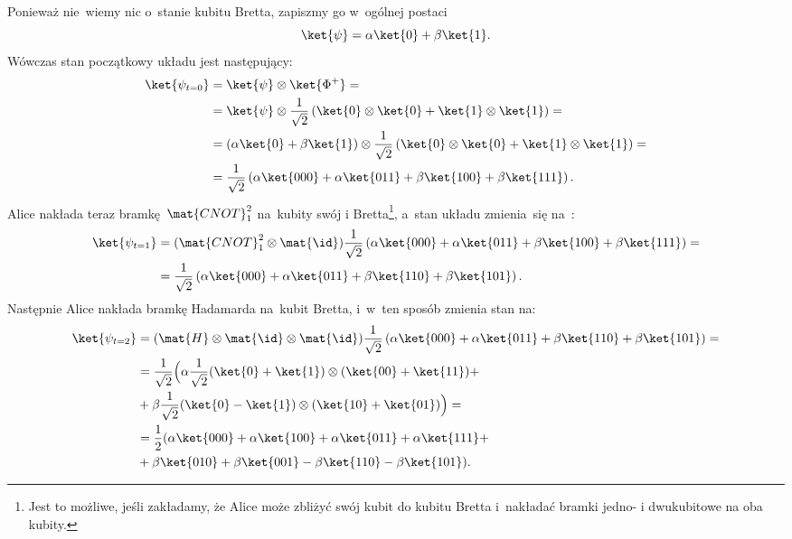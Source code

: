 Ponieważ nie~wiemy nic o~stanie kubitu Bretta, zapiszmy go w~ogólnej postaci
$$
	\ket{\psi} = \alpha \ket{0} + \beta \ket{1}.
$$
Wówczas stan początkowy układu jest następujący:
\begin{equation*}
	\begin{split}
		\ket{\psi_{t=0}} &=  \ket{\psi} \otimes \ket{\Phi^+}  =\\
		&= \ket{\psi} \otimes \frac{1}{\sqrt{2}}\left( \ket{0} \otimes \ket{0} +\ket{1} \otimes \ket{1} \right) = \\
		&= \left(\alpha \ket{0} + \beta  \ket{1}\right) \otimes \frac{1}{\sqrt{2}}\left( \ket{0} \otimes \ket{0} +\ket{1} \otimes \ket{1} \right)= \\
		&= \frac{1}{\sqrt{2}} \left(\alpha \ket{000} + \alpha \ket{011} + \beta  \ket{100} + \beta  \ket{111}  \right).
	\end{split}
\end{equation*}
Alice nakłada teraz bramkę~$\mat{CNOT}_1^2$ na~kubity swój i
Bretta\footnote{Jest to możliwe, jeśli zakładamy, że Alice może zbliżyć swój
	kubit do kubitu Bretta i~nakładać bramki jedno- i dwukubitowe na oba
	kubity.}, a~stan układu zmienia~się na~:
\begin{equation*}
	\begin{split}
		\ket{\psi_{t=1}} &= (\mat{CNOT}_1^2\otimes \mat{\id}) \frac{1}{\sqrt{2}} \left(\alpha \ket{000} + \alpha \ket{011} + \beta \ket{100} + \beta \ket{111}  \right) =\\
		&=\frac{1}{\sqrt{2}} \left(\alpha \ket{000} + \alpha \ket{011} + \beta \ket{110} + \beta \ket{101}  \right).
	\end{split}
\end{equation*}
Następnie Alice nakłada bramkę Hadamarda na~kubit Bretta, i~w~ten sposób zmienia stan na:
\begin{equation*}
	\begin{split}
		\ket{\psi_{t=2}} &=( \mat{H}\otimes\mat{\id}\otimes\mat{\id}) \frac{1}{\sqrt{2}} \left(\alpha \ket{000} + \alpha \ket{011} + \beta \ket{110} + \beta \ket{101}  \right) =\\
		&= \frac{1}{\sqrt{2}} \Big(
		\alpha \frac{1}{\sqrt{2}}(\ket{0}+\ket{1})\otimes (\ket{00} +  \ket{11}) + \\
		& + \beta \frac{1}{\sqrt{2}}(\ket{0}-\ket{1})\otimes(\ket{10} + \ket{01}) \Big) =\\
		&= \frac{1}{2} (\alpha \ket{000} + \alpha \ket{100}  + \alpha \ket{011} + \alpha \ket{111} + \\
		&+ \beta \ket{010} + \beta \ket{001} - \beta \ket{110} - \beta \ket{101} ).
	\end{split}
\end{equation*}
